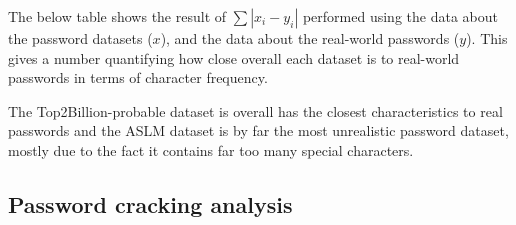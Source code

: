 \documentclass[11pt]{article}
\begin{document}
The below table shows the result of $\sum{|x_i-y_i|}$ performed using the data about the password datasets ($x$), and the data about the real-world passwords ($y$). This gives a number quantifying how close overall each dataset is to real-world passwords in terms of character frequency.
\begin{center}
\end{center}
The Top2Billion-probable dataset is overall has the closest characteristics to real passwords and the ASLM dataset is by far the most unrealistic password dataset, mostly due to the fact it contains far too many special characters.


\subsection{Password cracking analysis} \label{crack}
\end{document}
